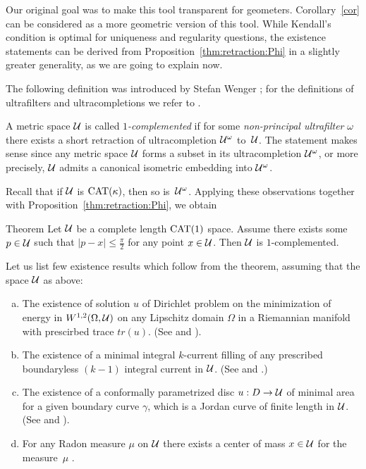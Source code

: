 \documentclass[oneside,a4paper, 12pt]{article}
\begin{document}
Our original goal was to make this tool transparent for geometers.
Corollary~\ref{cor} can be considered as a more geometric version of this tool.
While Kendall's condition is optimal for uniqueness and regularity questions, the existence statements can be derived from  Proposition~\ref{thm:retraction:Phi} in a
slightly greater generality, as  we are going to explain now.

The following definition was introduced by Stefan Wenger \cite{Wenger-1comp};
for the definitions of ultrafilters and ultracompletions we refer to \cite{Wenger-1comp,guo-wenger,akp}.

A metric space ${\mathcal{U}}$ is called \emph{$1$-complemented} if for some \emph{non-principal ultrafilter} $\omega$  there exists a short retraction of ultracompletion ${\mathcal{U}}^{\omega}$ to~${\mathcal{U}}$.
The statement makes sense since any metric space ${\mathcal{U}}$ forms a subset in its ultracompletion ${\mathcal{U}}^{\omega}$, or more precisely, ${\mathcal{U}}$ admits a canonical isometric embedding into ${\mathcal{U}}^{\omega}$. 

Recall that if ${\mathcal{U}}$ is $\mathrm{CAT}(\kappa)$, then so is~${\mathcal{U}}^\omega$. 
Applying these observations together with Proposition~\ref{thm:retraction:Phi}, we obtain

\begin{thm}{Theorem}\label{thm:complemented}
Let ${\mathcal{U}}$ be a complete length $\mathrm{CAT}(1)$ space.
Assume  there exists some $p\in {\mathcal{U}}$ such that $|p-x|\le \tfrac\pi2$ for any point $x\in {\mathcal{U}}$.
Then ${\mathcal{U}}$ is $1$-complemented.
\end{thm}

Let us list few existence results which follow from the theorem, assuming that the space ${\mathcal{U}}$ as above:
\begin{enumerate}[(a)]
\item\label{dirichlet}   The existence of solution $u$ of Dirichlet problem on the minimization of energy 
in $W^{1,2} (\Omega, {\mathcal{U}})$ on any Lipschitz domain $\Omega$ in a Riemannian manifold with prescirbed trace $tr(u)$.
(See \cite{KS} and \cite[Theorem 1.4]{guo-wenger}).
\item The existence of a minimal integral $k$-current filling of any prescribed boundaryless $(k-1)$ integral current in ${\mathcal{U}}$. 
(See \cite{Ambrosio} and \cite[Theorem 3.3]{Wenger-1comp}.)
\item   The existence of a conformally parametrized disc $u:D\to {\mathcal{U}}$ of minimal area for a given boundary curve $\gamma$, which is a Jordan curve of finite length in ${\mathcal{U}}$.
(See \cite{LWplateau} and \cite[Theorem 1.2]{guo-wenger}).
\item\label{center} For any Radon measure $\mu$ on ${\mathcal{U}}$ there exists a center of mass $x\in {\mathcal{U}}$ for the measure~$\mu$ \cite{Sturm, yokota}.
\end{enumerate}
\end{document}
